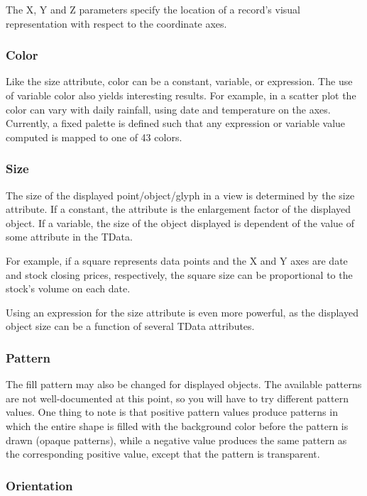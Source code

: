 The X, Y and Z parameters specify the location of a record's visual
representation with respect to the coordinate axes.

\subsubsection{Color}

Like the size attribute, color can be a constant, variable, or expression. The
use of variable color also yields interesting results. For example, in a scatter
plot the color can vary with daily rainfall, using date and temperature on the
axes. Currently, a fixed palette is defined such that any expression or variable
value computed is mapped to one of 43 colors.

\subsubsection{Size}

The size of the displayed point/object/glyph in a view is determined by the size
attribute. If a constant, the attribute is the enlargement factor of the
displayed object. If a variable, the size of the object displayed is dependent
of the value of some attribute in the TData.

For example, if a square represents data points and the X and Y axes are date
and stock closing prices, respectively, the square size can be proportional to
the stock's volume on each date.

Using an expression for the size attribute is even more powerful, as the
displayed object size can be a function of several TData attributes.

\subsubsection{Pattern}

The fill pattern may also be changed for displayed objects.  The available
patterns are not well-documented at this point, so you will have to try
different pattern values.  One thing to note is that positive pattern values
produce patterns in which the entire shape is filled with the background
color before the pattern is drawn (opaque patterns), while a negative value
produces the same pattern as the corresponding positive value, except that
the pattern is transparent.

\subsubsection{Orientation}

